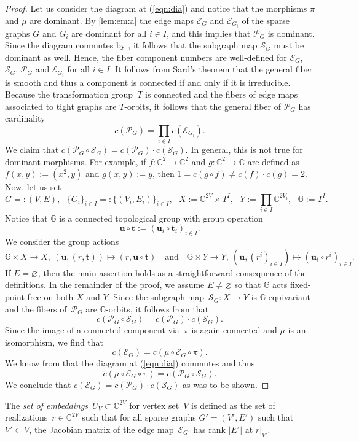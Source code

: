 \documentclass[12pt]{article}
\theoremstyle{definition}
\newcommand{\EQN}[1]{(\ref{eqn:#1})}
\newcommand{\RL}[2]{\Cref{lem:#1}\ref{lem:#1:#2}}
\newcommand{\df}[1]{{\it #1}}
\newcommand{\st}{such that }
\renewcommand{\c}{\colon}
\newcommand{\C}{{\mathbb{C}}}
\newcommand{\G}{{\mathbb{G}}}
\newcommand{\cE}{\mathcal{E}}
\newcommand{\cP}{\mathcal{P}}
\newcommand{\cS}{\mathcal{S}}
\newcommand{\bt}{\mathbf{t}}
\newcommand{\bu}{\mathbf{u}}
\begin{document}
\begin{proof}
Let us consider the diagram at \EQN{dia} and notice that the morphisms $\pi$ and $\mu$ are dominant.
By \RL{em}{a} the edge maps $\cE_G$ and $\cE_{G_i}$ of the sparse graphs $G$ and $G_i$
are dominant for all $i\in I$, and this implies that $\cP_G$ is dominant.
Since the diagram commutes by , it follows that the subgraph map $\cS_G$ must be dominant as well.
Hence, the fiber component numbers are well-defined for $\cE_G$, $\cS_G$, $\cP_G$
and $\cE_{G_i}$ for all $i\in I$.
It follows from Sard's theorem that the general fiber is smooth and
thus a component is connected if and only if it is irreducible.
Because the transformation group~$T$ is connected
and the fibers of edge maps associated to tight graphs are $T$-orbits,
it follows that the general fiber of $\cP_G$ has cardinality
\[
c(\cP_G)=\prod_{i\in I}c(\cE_{G_i}).
\]
We claim that $c(\cP_G\circ\cS_G)=c(\cP_G)\cdot c(\cS_G)$.
In general, this is not true for dominant morphisms. For example, if $f\c\C^2\to\C^2$ and $g\c\C^2\to\C$ are defined as $f(x,y):=(x^2,y)$ and $g(x,y):=y$,
then $1=c(g\circ f)\neq c(f)\cdot c(g)=2$. Now, let us set
\[
G=:(V,E),~~~
\{G_i\}_{i\in I}=:\{(V_i,E_i)\}_{i\in I},~~~
X:=\C^{2V}\times T^I,~~~
Y:=\prod_{i\in I}\C^{2V_i},~~~
\G:=T^I.
\]
Notice that $\G$ is a connected topological group with group operation
\[
\bu\circ\bt:=(\bu_i\circ\bt_i)_{i\in I}.
\]
We consider the group actions
\[
\G\times X\to X,~(\bu,(r,\bt))\mapsto (r,\bu\circ\bt)
\quad\text{and}\quad
\G\times Y\to Y,~(\bu,(r^i)_{i\in I})\mapsto(\bu_i\circ r^i)_{i\in I}.
\]
If $E=\varnothing$, then the main assertion holds as a straightforward consequence of the definitions.
In the remainder of the proof, we assume $E\neq\varnothing$
so that $\G$ acts fixed-point free on both $X$ and $Y$.
Since the subgraph map~$\cS_G\c X\to Y$ is $\G$-equivariant
and the fibers of~$\cP_G$ are $\G$-orbits, it follows from
 that
\[
c(\cP_G\circ\cS_G)=c(\cP_G)\cdot c(\cS_G).
\]
Since the image of a connected component via~$\pi$ is again connected
and $\mu$ is an isomorphism, we find that
\[
c(\cE_G)=c(\mu\circ \cE_G\circ\pi).
\]
We know from  that the diagram at \EQN{dia} commutes
and thus
\[
c(\mu\circ \cE_G\circ\pi)=c(\cP_G\circ\cS_G).
\]
We conclude that $c(\cE_G)=c(\cP_G)\cdot c(\cS_G)$ as was to be shown.
\end{proof}

The \df{set of embeddings}~$U_V\subset \C^{2V}$
for vertex set~$V$
is defined as the set of realizations~$r\in \C^{2V}$
\st for all sparse graphs $G'=(V',E')$ \st $V'\subset V$,
the Jacobian matrix of the edge map~$\cE_{G'}$
has rank $|E'|$ at $r|_{V'}$.
\end{document}
